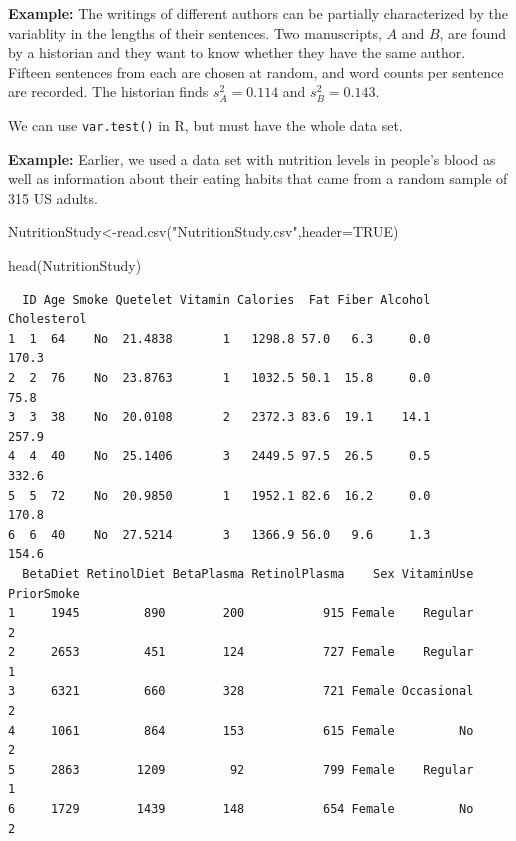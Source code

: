 \documentclass[
  letterpaper,
  DIV=11,
  numbers=noendperiod]{scrartcl}
\newenvironment{Shaded}{\begin{snugshade}}{\end{snugshade}}
\newcommand{\AttributeTok}[1]{\textcolor[rgb]{0.40,0.45,0.13}{#1}}
\newcommand{\ConstantTok}[1]{\textcolor[rgb]{0.56,0.35,0.01}{#1}}
\newcommand{\FunctionTok}[1]{\textcolor[rgb]{0.28,0.35,0.67}{#1}}
\newcommand{\NormalTok}[1]{\textcolor[rgb]{0.00,0.23,0.31}{#1}}
\newcommand{\OtherTok}[1]{\textcolor[rgb]{0.00,0.23,0.31}{#1}}
\newcommand{\StringTok}[1]{\textcolor[rgb]{0.13,0.47,0.30}{#1}}
\begin{document}
\textbf{Example:} The writings of different authors can be partially
characterized by the variablity in the lengths of their sentences. Two
manuscripts, \(A\) and \(B\), are found by a historian and they want to
know whether they have the same author. Fifteen sentences from each are
chosen at random, and word counts per sentence are recorded. The
historian finds \(s_A^2= 0.114\) and \(s_B^2= 0.143\).

\hfill\break
\hfill\break
\hfill\break
\hfill\break
\hfill\break
\hfill\break
\hfill\break
\hfill\break
\hfill\break
\hfill\break
\hfill\break
\hfill\break
\hfill\break
\hfill\break
\hfill\break
\hfill\break

We can use \texttt{var.test()} in R, but must have the whole data set.

\textbf{Example:} Earlier, we used a data set with nutrition levels in
people's blood as well as information about their eating habits that
came from a random sample of 315 US adults.

\begin{Shaded}
\begin{Highlighting}[]
\NormalTok{NutritionStudy}\OtherTok{\textless{}{-}}\FunctionTok{read.csv}\NormalTok{(}\StringTok{"NutritionStudy.csv"}\NormalTok{,}\AttributeTok{header=}\ConstantTok{TRUE}\NormalTok{)}

\FunctionTok{head}\NormalTok{(NutritionStudy)}
\end{Highlighting}
\end{Shaded}

\begin{verbatim}
  ID Age Smoke Quetelet Vitamin Calories  Fat Fiber Alcohol Cholesterol
1  1  64    No  21.4838       1   1298.8 57.0   6.3     0.0       170.3
2  2  76    No  23.8763       1   1032.5 50.1  15.8     0.0        75.8
3  3  38    No  20.0108       2   2372.3 83.6  19.1    14.1       257.9
4  4  40    No  25.1406       3   2449.5 97.5  26.5     0.5       332.6
5  5  72    No  20.9850       1   1952.1 82.6  16.2     0.0       170.8
6  6  40    No  27.5214       3   1366.9 56.0   9.6     1.3       154.6
  BetaDiet RetinolDiet BetaPlasma RetinolPlasma    Sex VitaminUse PriorSmoke
1     1945         890        200           915 Female    Regular          2
2     2653         451        124           727 Female    Regular          1
3     6321         660        328           721 Female Occasional          2
4     1061         864        153           615 Female         No          2
5     2863        1209         92           799 Female    Regular          1
6     1729        1439        148           654 Female         No          2
\end{verbatim}
\end{document}
